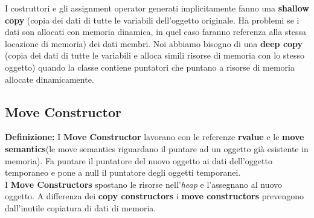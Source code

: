 \textsf{\small I costruttori e gli assignment operator generati implicitamente fanno una \textbf{shallow copy} (copia dei dati di tutte le variabili dell'oggetto originale. Ha problemi se i dati son allocati con memoria dinamica, in quel caso faranno referenza alla stessa locazione di memoria) dei dati membri. Noi abbiamo bisogno di una \textbf{deep copy} (copia dei dati di tutte le variabili e alloca simili risorse di memoria con lo stesso oggetto) quando la classe contiene puntatori che puntano a risorse di memoria allocate dinamicamente.} \\

\subsection{Move Constructor}

\textsf{\small \textbf{Definizione: } I \textbf{Move Constructor} lavorano con le referenze \textbf{rvalue} e le \textbf{move semantics}(le move semantics riguardano il puntare ad un oggetto già esistente in memoria). Fa puntare il puntatore del nuovo oggetto ai dati dell'oggetto temporaneo e pone a null il puntatore degli oggetti temporanei.} \\

\textsf{\small I \textbf{Move Constructors} spostano le risorse nell'\emph{heap} e l'assegnano al nuovo oggetto. A differenza dei \textbf{copy constructors} i \textbf{move constructors} prevengono dall'inutile copiatura di dati di memoria.} \\

